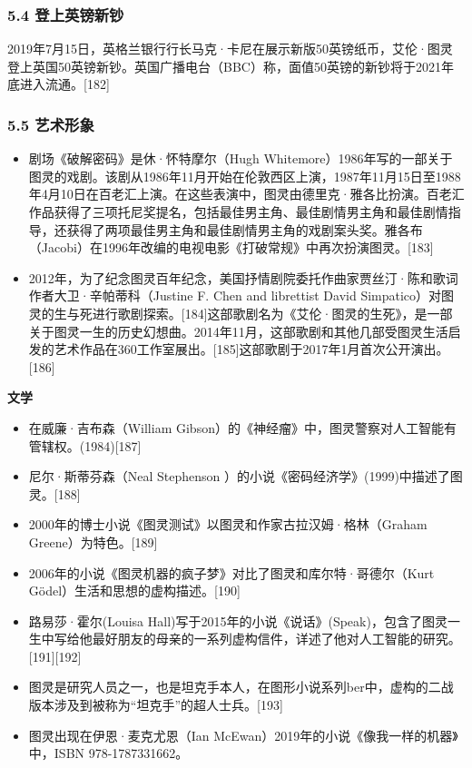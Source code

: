 \subsubsection{5.4 登上英镑新钞}
2019年7月15日，英格兰银行行长马克·卡尼在展示新版50英镑纸币，艾伦·图灵登上英国50英镑新钞。英国广播电台（BBC）称，面值50英镑的新钞将于2021年底进入流通。[182]
\subsubsection{5.5 艺术形象}

\begin{itemize}
\item 剧场《破解密码》是休·怀特摩尔（Hugh Whitemore）1986年写的一部关于图灵的戏剧。该剧从1986年11月开始在伦敦西区上演，1987年11月15日至1988年4月10日在百老汇上演。在这些表演中，图灵由德里克·雅各比扮演。百老汇作品获得了三项托尼奖提名，包括最佳男主角、最佳剧情男主角和最佳剧情指导，还获得了两项最佳男主角和最佳剧情男主角的戏剧案头奖。雅各布（Jacobi）在1996年改编的电视电影《打破常规》中再次扮演图灵。[183]
\item 2012年，为了纪念图灵百年纪念，美国抒情剧院委托作曲家贾丝汀·陈和歌词作者大卫·辛帕蒂科（Justine F. Chen and librettist David Simpatico）对图灵的生与死进行歌剧探索。[184]这部歌剧名为《艾伦·图灵的生死》，是一部关于图灵一生的历史幻想曲。2014年11月，这部歌剧和其他几部受图灵生活启发的艺术作品在360工作室展出。[185]这部歌剧于2017年1月首次公开演出。[186]
\end{itemize}

\textbf{文学}
\begin{itemize}
\item 在威廉·吉布森（William Gibson）的《神经瘤》中，图灵警察对人工智能有管辖权。(1984)[187]
\item 尼尔·斯蒂芬森（Neal Stephenson ）的小说《密码经济学》(1999)中描述了图灵。[188]
\item 2000年的博士小说《图灵测试》以图灵和作家古拉汉姆·格林（Graham Greene）为特色。[189]
\item 2006年的小说《图灵机器的疯子梦》对比了图灵和库尔特·哥德尔（Kurt Gödel）生活和思想的虚构描述。[190]
\item 路易莎·霍尔(Louisa Hall)写于2015年的小说《说话》(Speak)，包含了图灵一生中写给他最好朋友的母亲的一系列虚构信件，详述了他对人工智能的研究。[191][192]
\item 图灵是研究人员之一，也是坦克手本人，在图形小说系列ber中，虚构的二战版本涉及到被称为“坦克手”的超人士兵。[193]
\item 图灵出现在伊恩·麦克尤恩（Ian McEwan）2019年的小说《像我一样的机器》中，ISBN 978-1787331662。
\end{itemize}

